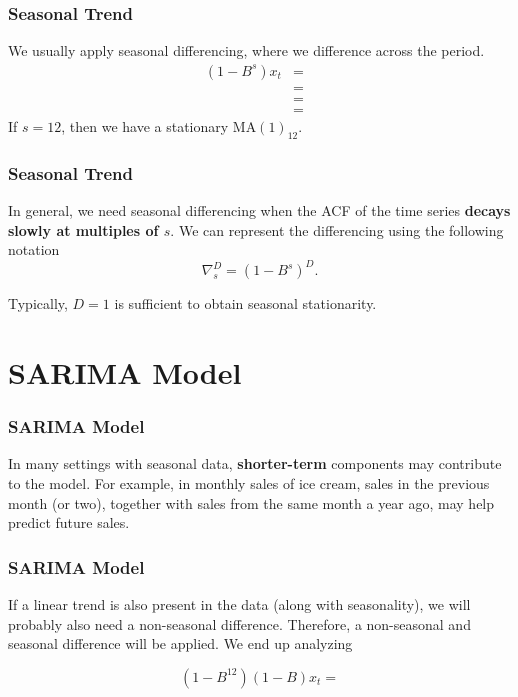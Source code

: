 \documentclass[%
xcolor=pdftex]{beamer}
\begin{document}
\begin{frame}
\frametitle{Seasonal Trend}

We usually apply seasonal differencing, where we difference across the period.
\begin{eqnarray*}
(1-B^s)x_t &=& \nonumber \\
           &=& \nonumber \\
           &=& \nonumber \\
           &=&
\end{eqnarray*}
If $s=12$, then we have a stationary MA$(1)_{12}$.

\end{frame}

\begin{frame}
\frametitle{Seasonal Trend}

In general, we need seasonal differencing when the ACF of the time series \textbf{decays slowly at multiples of $s$}. We can represent the differencing using the following notation
$$
\nabla_s^D=(1-B^s)^D.
$$

Typically, $D=1$ is sufficient to obtain seasonal stationarity. %

\end{frame}

\section{SARIMA Model}
\frame{\tableofcontents[currentsection]}

\begin{frame}
\frametitle{SARIMA Model}

In many settings with seasonal data, \textbf{shorter-term} components may contribute to the model. For example, in monthly sales of ice cream, sales in the previous month (or two), together with sales from the same month a year ago, may help predict future sales.

\end{frame}


\begin{frame}
\frametitle{SARIMA Model}

If a linear trend is also present in the data (along with seasonality), we will probably also need a non-seasonal difference. Therefore, a non-seasonal and seasonal difference will be applied. We end up analyzing

$$
(1-B^{12})(1-B)x_t =
$$

\end{frame}
\end{document}
